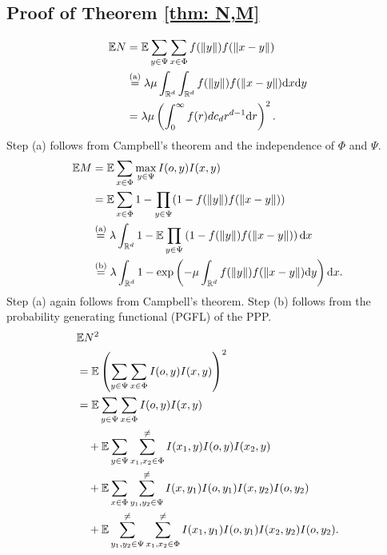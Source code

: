 \subsection{Proof of Theorem \ref{thm: N,M}}
\label{appendix: N,M}
 \begin{align}
       \Ex N  %
       &=\Ex\sum_{y\in\Psi}\sum_{x \in\Phi} f(\|y\|)f(\|x-y\|)\nonumber\\
       &\peq{a}\lambda\mu \int_{\mathbb{R}^d}\int_{\mathbb{R}^d}  f(\|y\|)f(\|x-y\|) \dd x \dd y\nonumber\\
       & = \lambda\mu \left(\int_{0}^{\infty}f(r)dc_d r^{d-1} \dd r\right)^2.\nonumber
    \end{align}
 Step (a) follows from Campbell's theorem and the independence of $\Phi$ and $\Psi$. 
 \begin{align}
            \nonumber\mathbb{E} M & =  
            \mathbb{E}\sum_{x \in\Phi} \max_{y\in\Psi}I(o,y)I(x,y)\nonumber \\
            & = \mathbb{E}\sum_{x\in\Phi}1-\prod_{y\in\Psi} (1-f(\|y\|)f(\|x-y\|))\\
            & \stackrel{\text{\scriptsize(a)}}{=}\lambda \int_{\mathbb{R}^d}1- \mathbb{E}\prod_{y\in\Psi} \left(1-f(\|y\|)f(\|x-y\|)\right) \mathrm{d} x \nonumber\\
     & \stackrel{\text{\scriptsize(b)}}{=}  \lambda\int_{\mathbb{R}^d}  1-\exp\left(-\mu\int_{\mathbb{R}^d}f(\|y\|)f(\|x-y\|)\mathrm{d} y\right) \mathrm{d} x.\nonumber
   \end{align}   
   Step (a) again follows from Campbell's theorem. Step (b) follows from the probability generating functional (PGFL) of the PPP.
   \begin{align}
  & \mathbb{E} N^2 \nonumber \\
   &= \mathbb{E} \left(\sum_{y\in\Psi}\sum_{x \in\Phi} I(o,y)I(x,y)\right)^2\nonumber\\
       & = \mathbb{E} \sum_{y\in\Psi}\sum_{x \in\Phi} I(o,y)I(x,y) \nonumber\\
       &\quad+\mathbb{E}\sum_{y\in\Psi}\sum_{x_1,x_2\in\Phi}^{\neq} I(x_1,y)I(o,y)I(x_2,y)\nonumber\\
       &\quad+\mathbb{E}\sum_{x\in\Phi}\sum_{y_1,y_2\in\Psi}^{\neq} I(x,y_1)I(o,y_1)I(x,y_2)I(o,y_2)\nonumber\\
       &\quad+\mathbb{E}\sum_{y_1,y_2\in\Psi}^{\neq}\sum_{x_1,x_2\in\Phi}^{\neq} I(x_1,y_1)I(o,y_1)I(x_2,y_2)I(o,y_2).\nonumber
   \end{align}
